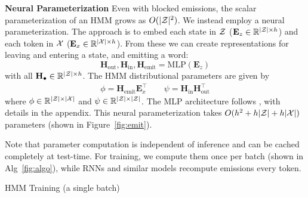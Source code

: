 \documentclass[11pt,a4paper]{article}
\begin{document}
\vspace{0.2cm}

\noindent
\textbf{Neural Parameterization}
Even with blocked emissions, the scalar parameterization of an HMM grows as $O(|\mathcal{Z}|^2)$.
We instead employ a neural parameterization.
The approach is to embed each state in $\mathcal{Z}$ ($\mathbf{E}_z \in \mathbb{R}^{|\mathcal{Z}| \times h}$)
and each token in $\cal X$ ($\mathbf{E}_x \in \mathbb{R}^{|\mathcal{X}| \times h}$).
From these we can create representations for leaving and entering a state,
and emitting a word: 
\[ \mathbf{H}_{\textrm{out}},\mathbf{H}_{\textrm{in}},\mathbf{H}_\textrm{emit}
 = \text{MLP}( \mathbf{E}_z ) \] 
with all $\mathbf{H}_{\bullet} \in \mathbb{R}^{|\mathcal{Z}|\times h}$.
The HMM distributional parameters are given by
\begin{equation}
\begin{aligned}
\phi = \mathbf{H}_\textrm{emit}\mathbf{E}_x ^\top \qquad 
\psi = \mathbf{H}_\textrm{in}\mathbf{H}_\textrm{out}^\top
\end{aligned}
\end{equation}
where $\phi \in \mathbb{R}^{|\mathcal{Z}|\times|\mathcal{X}|}$ and
$\psi \in \mathbb{R}^{|\mathcal{Z}|\times|\mathcal{Z}|}$.
The MLP architecture follows \cite{kim2019cpcfg}, with details in the appendix.
This neural parameterization takes $O(h^2 + h|\mathcal{Z}| + h|\mathcal{X}|)$ parameters
(shown in Figure~\ref{fig:emit}).

Note that parameter computation is independent of inference
and can be cached completely at test-time.
For training, we compute them once per batch (shown in Alg~\ref{fig:algo}),
while RNNs and similar models recompute emissions every token.

\begin{algorithm}[t]
\begin{algorithmic}
        \EndFor
    \EndFor
\end{algorithmic}
\caption{
\label{fig:algo}
HMM Training (a single batch)
}
\end{algorithm}

\vspace{0.2cm}
\end{document}
